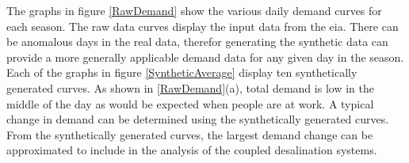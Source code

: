 The graphs in figure \ref{RawDemand} show the various daily demand curves for each season. The raw data curves display the input data from the \ac{eia}. There can be anomalous days in the real data, therefor generating the synthetic data can provide a more generally applicable demand data for any given day in the season.  Each of the graphs in figure \ref{SyntheticAverage} display ten synthetically generated curves. As shown in \ref{RawDemand}(a), total demand is low in the middle of the day as would be expected when people are at work. A typical change in demand can be determined using the synthetically generated curves. From the synthetically generated curves, the largest demand change can be approximated to include in the analysis of the coupled desalination systems.



